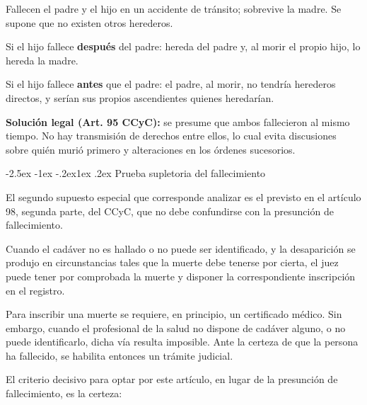 \documentclass[12pt,oneside]{book}
\makeatletter
\renewcommand\subsection{\@startsection{subsection}{2}{\z@}%
  {-2.5ex \@plus -1ex \@minus -.2ex}{1ex \@plus .2ex}%
  {\normalfont\normalsize\bfseries}}
\makeatother
\begin{document}
\begin{ejemplo}
Fallecen el padre y el hijo en un accidente de tránsito; sobrevive la madre. Se supone que no existen otros herederos.

Si el hijo fallece \textbf{después} del padre: hereda del padre y, al morir el propio hijo, lo hereda la madre.

Si el hijo fallece \textbf{antes} que el padre: el padre, al morir, no tendría herederos directos, y serían sus propios ascendientes quienes heredarían.

\textbf{Solución legal (Art. 95 CCyC):} se presume que ambos fallecieron al mismo tiempo. No hay transmisión de derechos entre ellos, lo cual evita discusiones sobre quién murió primero y alteraciones en los órdenes sucesorios.
\end{ejemplo}

\subsection{Prueba supletoria del fallecimiento}\label{sec:prueba-supletoria}

El segundo supuesto especial que corresponde analizar es el previsto en el artículo 98, segunda parte, del CCyC, que no debe confundirse con la presunción de fallecimiento.

\begin{regla}
Cuando el cadáver no es hallado o no puede ser identificado, y la desaparición se produjo en circunstancias tales que la muerte debe tenerse por cierta, el juez puede tener por comprobada la muerte y disponer la correspondiente inscripción en el registro.
\end{regla}

Para inscribir una muerte se requiere, en principio, un certificado médico. Sin embargo, cuando el profesional de la salud no dispone de cadáver alguno, o no puede identificarlo, dicha vía resulta imposible. Ante la certeza de que la persona ha fallecido, se habilita entonces un trámite judicial.

El criterio decisivo para optar por este artículo, en lugar de la presunción de fallecimiento, es la certeza:
\end{document}

